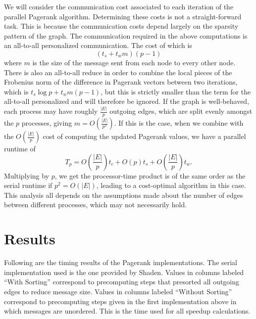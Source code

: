 \documentclass[a4paper]{article}
\begin{document}
We will consider the communication cost associated to each iteration of the parallel Pagerank algorithm. Determining these costs is not a straight-forward task. This is because the communication
costs depend largely on the sparsity pattern of the graph. The communication required in the above computations is an all-to-all personalized
communication. The cost of which is
\[ (t_s + t_w m) (p - 1) \]
where $m$ is the size of the message sent from each node to every other node. There is also an all-to-all reduce in order to combine the local pieces
of the Frobenius norm of the difference in Pagerank vectors between two iterations, which is $t_s \log p + t_w m (p-1)$, but this is strictly smaller
than the term for the all-to-all personalized and will therefore be ignored. If the graph is well-behaved, each process may have roughly
$\frac{|E|}{p}$ outgoing edges, which are split evenly amongst the $p$ processes, giving $m = O \left( \frac{|E|}{p^2} \right)$. If this is the case,
when we combine with the $O \left( \frac{|E|}{p} \right)$ cost of computing the updated Pagerank values, we have a parallel runtime of
\[ T_p = O \left( \frac{|E|}{p} \right) t_c + O(p) t_s + O \left( \frac{|E|}{p} \right) t_w .\]
Multiplying by $p$, we get the processor-time product is of the same order as the serial runtime if $p^2 = O(|E|)$, leading to a cost-optimal
algorithm in this case. This analysis all depends on the assumptions made about the number of edges between different processes, which may not
necessarily hold.


\section{Results}

Following are the timing results of the Pagerank implementations. The serial implementation used is the one provided by Shaden. Values in columns
labeled ``With Sorting'' correspond to precomputing steps that presorted all outgoing edges to reduce message size. Values in columns labeled
``Without Sorting'' correspond to precomputing steps given in the first implementation above in which messages are unordered. This is the time used
for all speedup calculations.
\end{document}
